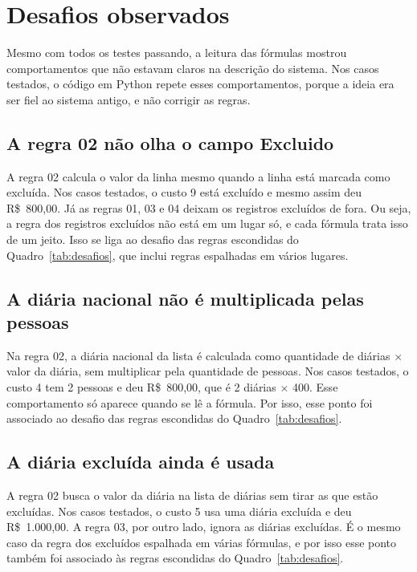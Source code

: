 \section{Desafios observados}
\label{sec:desafios-observados}

Mesmo com todos os testes passando, a leitura das fórmulas mostrou comportamentos que não estavam claros na descrição do sistema. Nos casos testados, o código em Python repete esses comportamentos, porque a ideia era ser fiel ao sistema antigo, e não corrigir as regras.

\subsection*{A regra 02 não olha o campo Excluido}

A regra 02 calcula o valor da linha mesmo quando a linha está marcada como excluída. Nos casos testados, o custo 9 está excluído e mesmo assim deu R\$~800,00. Já as regras 01, 03 e 04 deixam os registros excluídos de fora. Ou seja, a regra dos registros excluídos não está em um lugar só, e cada fórmula trata isso de um jeito. Isso se liga ao desafio das regras escondidas do Quadro~\ref{tab:desafios}, que inclui regras espalhadas em vários lugares.

\subsection*{A diária nacional não é multiplicada pelas pessoas}

Na regra 02, a diária nacional da lista é calculada como quantidade de diárias $\times$ valor da diária, sem multiplicar pela quantidade de pessoas. Nos casos testados, o custo 4 tem 2 pessoas e deu R\$~800,00, que é 2 diárias $\times$ 400. Esse comportamento só aparece quando se lê a fórmula. Por isso, esse ponto foi associado ao desafio das regras escondidas do Quadro~\ref{tab:desafios}.

\subsection*{A diária excluída ainda é usada}

A regra 02 busca o valor da diária na lista de diárias sem tirar as que estão excluídas. Nos casos testados, o custo 5 usa uma diária excluída e deu R\$~1.000,00. A regra 03, por outro lado, ignora as diárias excluídas. É o mesmo caso da regra dos excluídos espalhada em várias fórmulas, e por isso esse ponto também foi associado às regras escondidas do Quadro~\ref{tab:desafios}.

